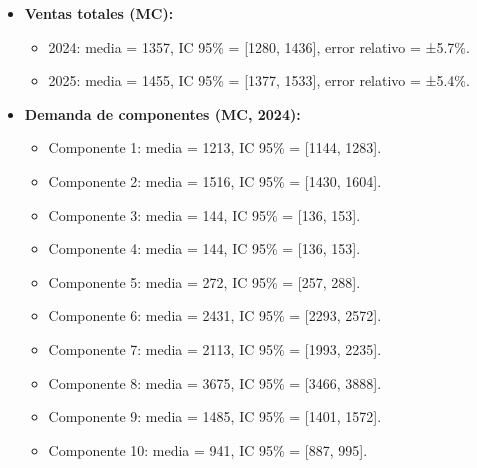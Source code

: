 \documentclass[12pt,a4paper]{article}
\begin{document}
\begin{itemize}\small
    \item \textbf{Ventas totales (MC):}
    \begin{itemize}\small
        \item 2024: media = 1357, IC 95\% = [1280, 1436], error relativo = ±5.7\%.
        \item 2025: media = 1455, IC 95\% = [1377, 1533], error relativo = ±5.4\%.
    \end{itemize}
    \item \textbf{Demanda de componentes (MC, 2024):}
    \begin{itemize}\small
        \item Componente 1: media = 1213, IC 95\% = [1144, 1283].
        \item Componente 2: media = 1516, IC 95\% = [1430, 1604].
        \item Componente 3: media = 144, IC 95\% = [136, 153].
        \item Componente 4: media = 144, IC 95\% = [136, 153].
        \item Componente 5: media = 272, IC 95\% = [257, 288].
        \item Componente 6: media = 2431, IC 95\% = [2293, 2572].
        \item Componente 7: media = 2113, IC 95\% = [1993, 2235].
        \item Componente 8: media = 3675, IC 95\% = [3466, 3888].
        \item Componente 9: media = 1485, IC 95\% = [1401, 1572].
        \item Componente 10: media = 941, IC 95\% = [887, 995].
    \end{itemize}
\end{itemize}
\end{document}
